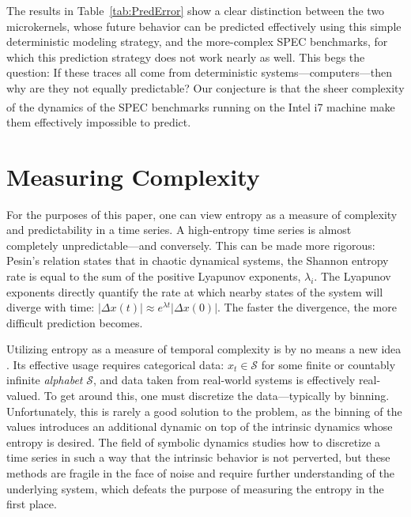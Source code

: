 \documentclass{article}
\begin{document}
The results in Table~\ref{tab:PredError} show a clear distinction
between the two microkernels, whose future behavior can be
predicted effectively using this simple deterministic modeling
strategy, and the more-complex SPEC benchmarks, for which this
prediction strategy does not work nearly as well.
%
This begs the question: If these traces all come from deterministic
systems---computers---then why are they not equally predictable?  Our
conjecture is that the sheer complexity of the dynamics of the SPEC
benchmarks running on the Intel i7\textsuperscript{\textregistered}
machine make them effectively impossible to predict.


\section{Measuring Complexity}\label{sec:meaComplex}

For the purposes of this paper, one can view entropy as a measure of
complexity and predictability in a time series.  A high-entropy time
series is almost completely unpredictable---and conversely.  This can
be made more rigorous: Pesin's relation \cite{pesin77} states that in
chaotic dynamical systems, the Shannon entropy rate is equal to the
sum of the positive Lyapunov exponents, $\lambda_i$. The Lyapunov
exponents directly quantify the rate at which nearby states of the
system will diverge with time: $\left| \Delta x(t) \right| \approx
e^{\lambda t} \left| \Delta x(0) \right|$.  The faster the divergence,
the more difficult prediction becomes.

Utilizing entropy as a measure of temporal complexity is by no means a new idea
\cite{Shannon1951, mantegna1994linguistic}.  Its effective usage
requires categorical data: $x_t \in \mathcal{S}$ for some finite or
countably infinite \emph{alphabet} $\mathcal{S}$, and data taken from
real-world systems is effectively real-valued.  To get around this,
one must discretize the data---typically by binning.  Unfortunately,
this is rarely a good solution to the problem, as the binning of the
values introduces an additional dynamic on top of the intrinsic
dynamics whose entropy is desired.  The field of symbolic dynamics
studies how to discretize a time series in such a way that the
intrinsic behavior is not perverted, but these methods are fragile in
the face of noise and require further understanding of the underlying
system, which defeats the purpose of measuring the entropy in the
first place.
\end{document}
